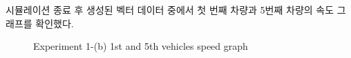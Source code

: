             시뮬레이션 종료 후 생성된 벡터 데이터 중에서 첫 번째 차량과 5번째 차량의 속도 그래프를 확인했다.
            \begin{figure}[h!]
                \centering
                \hspace{3mm}
                \caption{Experiment 1-(b) 1st and 5th vehicles speed graph}
                \vspace{-2mm}
            \end{figure}
            
